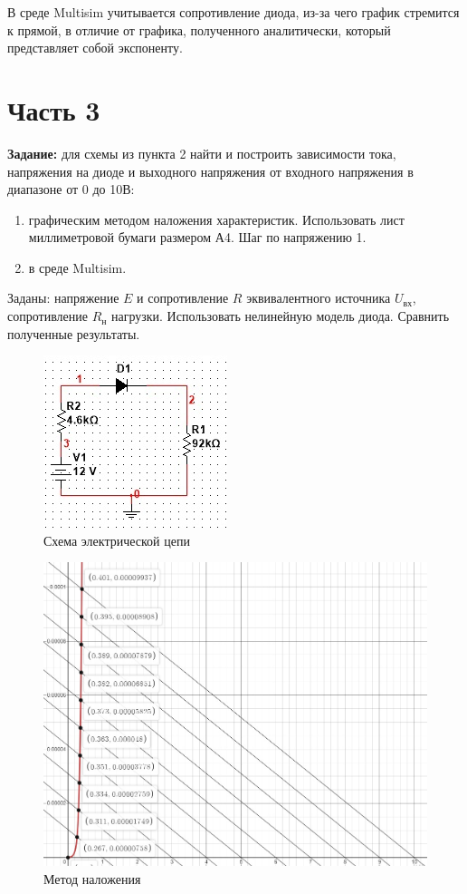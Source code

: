 \documentclass{labreport}
\begin{document}
В среде Multisim учитывается сопротивление диода, из-за чего график стремится к прямой, в отличие от графика, полученного аналитически, который представляет собой экспоненту.

\chapter{Часть 3}
\textbf{Задание:} для схемы из пункта 2 найти и построить зависимости тока, напряжения на диоде и выходного напряжения от входного напряжения в диапазоне от 0 до 10В: 
\begin{enumerate}
    \item  графическим методом наложения характеристик. Использовать лист миллиметровой бумаги размером А4. Шаг по напряжению 1. 
    \item  в среде Multisim. 
\end{enumerate}
    
Заданы: напряжение $E$ и сопротивление $R$ эквивалентного источника $U_\text{вх}$, сопротивление $R_\text{н}$ нагрузки. Использовать нелинейную модель диода. Сравнить полученные результаты.


\begin{figure}[h]
    \centering
    \includegraphics{ek_schema2.jpg}
    \caption{Схема электрической цепи}
\end{figure}

\begin{figure}[h]
    \centering
    \includegraphics[width=\linewidth]{ek_lay_graph.jpg}
    \caption{Метод наложения}
\end{figure}
\end{document}
